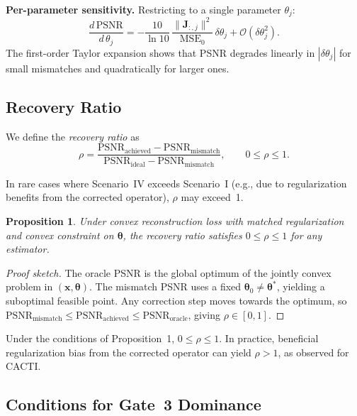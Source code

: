 \documentclass[11pt]{article}
\newtheorem{proposition}[theorem]{Proposition}
\theoremstyle{definition}
\begin{document}
\noindent\textbf{Per-parameter sensitivity.}
Restricting to a single parameter $\theta_j$:
\begin{equation}
  \frac{d\,\mathrm{PSNR}}{d\,\theta_j}
  = -\frac{10}{\ln 10}\,
    \frac{\|\mathbf{J}_{:,j}\|^2}{\mathrm{MSE}_0}\,\delta\theta_j
  + \mathcal{O}(\delta\theta_j^2).
\end{equation}
The first-order Taylor expansion shows that PSNR degrades linearly in
$|\delta\theta_j|$ for small mismatches and quadratically for larger ones.

\subsection{Recovery Ratio}

We define the \emph{recovery ratio} as
\begin{equation}
  \rho
  = \frac{\mathrm{PSNR}_{\mathrm{achieved}} - \mathrm{PSNR}_{\mathrm{mismatch}}}
         {\mathrm{PSNR}_{\mathrm{ideal}} - \mathrm{PSNR}_{\mathrm{mismatch}}},
  \qquad 0 \leq \rho \leq 1.
  \label{eq:rho}
\end{equation}

\noindent In rare cases where Scenario~IV exceeds Scenario~I (e.g., due to
regularization benefits from the corrected operator), $\rho$ may exceed~1.

\begin{proposition}
Under convex reconstruction loss with matched regularization and convex constraint on
$\boldsymbol{\theta}$, the recovery ratio satisfies $0 \leq \rho \leq 1$
for any estimator.
\end{proposition}

\begin{proof}[Proof sketch]
The oracle PSNR is the global optimum of the jointly convex problem in
$(\mathbf{x}, \boldsymbol{\theta})$.  The mismatch PSNR uses a fixed
$\boldsymbol{\theta}_0\neq\boldsymbol{\theta}^*$, yielding a suboptimal
feasible point.  Any correction step moves towards the optimum, so
$\mathrm{PSNR}_{\mathrm{mismatch}} \leq \mathrm{PSNR}_{\mathrm{achieved}}
\leq \mathrm{PSNR}_{\mathrm{oracle}}$, giving $\rho\in[0,1]$.
\end{proof}

\noindent Under the conditions of Proposition~1, $0 \leq \rho \leq 1$. In practice, beneficial regularization bias from the corrected operator can yield $\rho > 1$, as observed for CACTI.

\subsection{Conditions for Gate~3 Dominance}
\end{document}
